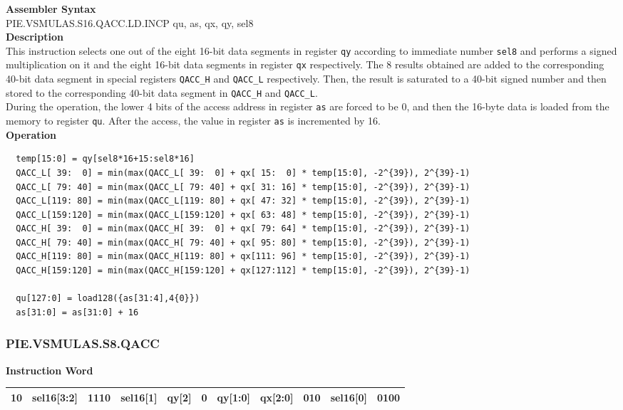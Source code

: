 \textbf{Assembler Syntax} \\
PIE.VSMULAS.S16.QACC.LD.INCP qu, as, qx, qy, sel8 \\
\textbf{Description} \\
This instruction selects one out of the eight 16-bit data segments in register \lstinline{qy} according to immediate number \lstinline{sel8} and performs a signed multiplication on it and the eight 16-bit data segments in register \lstinline{qx} respectively. The 8 results obtained are added to the corresponding 40-bit data segment in special registers \lstinline{QACC_H} and \lstinline{QACC_L} respectively. Then, the result is saturated to a 40-bit signed number and then stored to the corresponding 40-bit data segment in \lstinline{QACC_H} and \lstinline{QACC_L}.\\
During the operation, the lower 4 bits of the access address in register \lstinline{as} are forced to be 0, and then the 16-byte data is loaded from the memory to register \lstinline{qu}. After the access, the value in register \lstinline{as} is incremented by 16.\\
\textbf{Operation}
\begin{lstlisting}
  temp[15:0] = qy[sel8*16+15:sel8*16]
  QACC_L[ 39:  0] = min(max(QACC_L[ 39:  0] + qx[ 15:  0] * temp[15:0], -2^{39}), 2^{39}-1)
  QACC_L[ 79: 40] = min(max(QACC_L[ 79: 40] + qx[ 31: 16] * temp[15:0], -2^{39}), 2^{39}-1)
  QACC_L[119: 80] = min(max(QACC_L[119: 80] + qx[ 47: 32] * temp[15:0], -2^{39}), 2^{39}-1)
  QACC_L[159:120] = min(max(QACC_L[159:120] + qx[ 63: 48] * temp[15:0], -2^{39}), 2^{39}-1)
  QACC_H[ 39:  0] = min(max(QACC_H[ 39:  0] + qx[ 79: 64] * temp[15:0], -2^{39}), 2^{39}-1)
  QACC_H[ 79: 40] = min(max(QACC_H[ 79: 40] + qx[ 95: 80] * temp[15:0], -2^{39}), 2^{39}-1)
  QACC_H[119: 80] = min(max(QACC_H[119: 80] + qx[111: 96] * temp[15:0], -2^{39}), 2^{39}-1)
  QACC_H[159:120] = min(max(QACC_H[159:120] + qx[127:112] * temp[15:0], -2^{39}), 2^{39}-1)

  qu[127:0] = load128({as[31:4],4{0}})
  as[31:0] = as[31:0] + 16
\end{lstlisting}

\newpage
\subsubsection{PIE.VSMULAS.S8.QACC}\label{instruction:PIEVSMULASS8QACC}
\setlength\tabcolsep{6pt}
\textbf{Instruction Word} \\
\begin{tabular}{|c|c|c|c|c|c|c|c|c|c|c|}
	\hline
	10 & sel16[3:2] & 1110 & sel16[1] & qy[2] & 0 & qy[1:0] & qx[2:0] & 010 & sel16[0] & 0100 \\
	\hline
\end{tabular}

